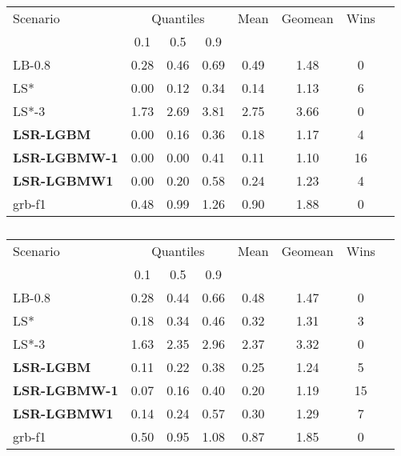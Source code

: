 \documentclass[3p, authoryear, times, doubleblind]{elsarticle}
\begin{document}
{\begin{table}[h]
\centering
\caption{}
\label{tab:primal_gap_ml_D_2-hour}
\begin{tabular}{lccccccc}
\toprule
{Scenario} & \multicolumn{3}{c}{Quantiles} & {Mean} & {Geomean} & {Wins} \\
{} & {0.1} & {0.5} & {0.9} & {} & {} & {} \\
\midrule
LB-0.8 & 0.28 & 0.46 & 0.69 & 0.49 & 1.48 & 0 \\
LS* & 0.00 & 0.12 & 0.34 & 0.14 & 1.13 & 6 \\
LS*-3 & 1.73 & 2.69 & 3.81 & 2.75 & 3.66 & 0 \\
\textbf{LSR-LGBM} & 0.00 & 0.16 & 0.36 & 0.18 & 1.17 & 4 \\
\textbf{LSR-LGBMW-1} & 0.00 & 0.00 & 0.41 & 0.11 & 1.10 & 16 \\
\textbf{LSR-LGBMW1} & 0.00 & 0.20 & 0.58 & 0.24 & 1.23 & 4 \\
grb-f1 & 0.48 & 0.99 & 1.26 & 0.90 & 1.88 & 0 \\
\bottomrule
\end{tabular}
\end{table}


\begin{table}[h]
\centering
\caption{}
\label{tab:primal_integral_ml_D_2-hour}
\begin{tabular}{lccccccc}
\toprule
{Scenario} & \multicolumn{3}{c}{Quantiles} & {Mean} & {Geomean} & {Wins} \\
{} & {0.1} & {0.5} & {0.9} & {} & {} & {} \\
\midrule
LB-0.8 & 0.28 & 0.44 & 0.66 & 0.48 & 1.47 & 0 \\
LS* & 0.18 & 0.34 & 0.46 & 0.32 & 1.31 & 3 \\
LS*-3 & 1.63 & 2.35 & 2.96 & 2.37 & 3.32 & 0 \\
\textbf{LSR-LGBM} & 0.11 & 0.22 & 0.38 & 0.25 & 1.24 & 5 \\
\textbf{LSR-LGBMW-1} & 0.07 & 0.16 & 0.40 & 0.20 & 1.19 & 15 \\
\textbf{LSR-LGBMW1} & 0.14 & 0.24 & 0.57 & 0.30 & 1.29 & 7 \\
grb-f1 & 0.50 & 0.95 & 1.08 & 0.87 & 1.85 & 0 \\
\bottomrule
\end{tabular}
\end{table}


}
\end{document}
